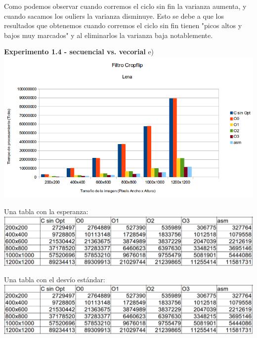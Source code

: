 \documentclass{article}
\begin{document}
Como podemos observar cuando corremos el ciclo sin fin la varianza aumenta, y cuando sacamos los ouliers la varianza disminuye.\newline
Esto se debe a que los resultados que obtenemos cuando corremos el ciclo sin fin tienen "picos altos y bajos muy marcados" y al eliminarlos la varianza baja notablemente.
\newpage

\textbf{Experimento 1.4 - secuencial vs. vecorial}\newline
e)
\vspace{0.4cm}
\includegraphics[width=\textwidth,height=\textheight,keepaspectratio
]{graficoOpt.png}
\begin {flushleft}
\end{flushleft}
Una tabla con la esperanza: \newline
\includegraphics[width=\textwidth,height=\textheight,keepaspectratio
]{tablaEsperanzaOpt.png}
\begin {flushleft}
\end{flushleft}

Una tabla con el desvío estándar:\newline
\includegraphics[width=\textwidth,height=\textheight,keepaspectratio
]{tablaEsperanzaOpt.png}
\begin {flushleft}
\end{flushleft}
\end{document}
